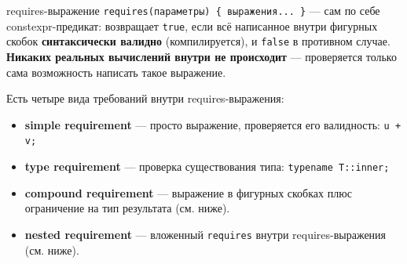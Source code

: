 \begin{definition}{requires-выражение}{}
\texttt{requires(параметры) \{ выражения... \}} --- сам по себе constexpr-предикат: возвращает \texttt{true}, если всё написанное внутри фигурных скобок \textbf{синтаксически валидно} (компилируется), и \texttt{false} в противном случае. \textbf{Никаких реальных вычислений внутри не происходит} --- проверяется только сама возможность написать такое выражение.
\end{definition}
Есть четыре вида требований внутри requires-выражения:
\begin{itemize}
  \item \textbf{simple requirement} --- просто выражение, проверяется его валидность: \texttt{u + v;}
  \item \textbf{type requirement} --- проверка существования типа: \texttt{typename T::inner;}
  \item \textbf{compound requirement} --- выражение в фигурных скобках плюс ограничение на тип результата (см. ниже).
  \item \textbf{nested requirement} --- вложенный \texttt{requires} внутри requires-выражения (см. ниже).
\end{itemize}
